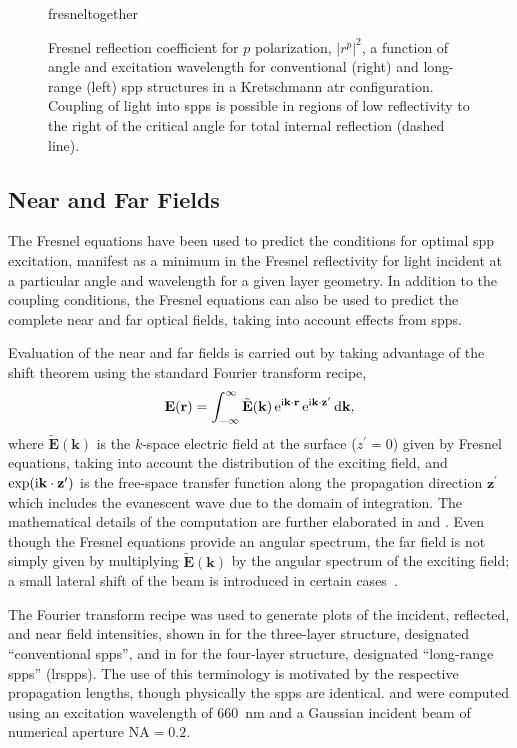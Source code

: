 \begin{figure}[ht]
	\centering
	{fresneltogether}
	\caption{Fresnel reflection coefficient for $p$ polarization, $|r^p|^2$, a
		function of angle and excitation wavelength for conventional (right) and
		long-range (left) \gls{spp} structures in a Kretschmann \gls{atr} configuration.
		Coupling of light into \glspl{spp} is possible in regions of low reflectivity to the right of the
		critical angle for total internal reflection (dashed line).}
	\label{fig:fresnelangle}
\end{figure}

\subsection{Near and Far Fields}\label{sec:fresnelnearfar}
The Fresnel equations have been used to predict the conditions for
optimal \gls{spp} excitation, manifest as a minimum in the Fresnel reflectivity
for light incident at a particular angle and wavelength for a given layer
geometry.  In addition to the coupling conditions, the Fresnel equations
can also be used to predict the complete near and far optical fields,
taking into account effects from \glspl{spp}.

Evaluation of the near and far fields is carried out by taking advantage of
the shift theorem using the standard Fourier transform recipe,
\begin{equation}
	\mathbf{E}(\mathbf{r}) = \int_{-\infty}^{\infty} \tilde{\mathbf{E}}(\mathbf{k})
	\,{\mathrm{e}}^{{\mathrm{i}} \mathbf{k} \cdot \mathbf{r}}
	\,{\mathrm{e}}^{{\mathrm{i}} \mathbf{k} \cdot \mathbf{z}^\prime} \,\mathrm{d} \mathbf{k},
\end{equation}
where $\tilde{\mathbf{E}}(\mathbf{k})$ is the $k$-space electric field at
the surface ($z^\prime=0$) given by Fresnel equations, taking into account
the distribution of the exciting field, and $\exp({\mathrm{i}} \mathbf{k} \cdot
	\mathbf{z}^\prime)$ is the free-space transfer function along the
propagation direction $\mathbf{z}^\prime$ which includes the evanescent
wave due to the domain of integration.  The mathematical details of the
computation are further elaborated in  and
.  Even though the Fresnel equations provide
an angular spectrum, the far field is not simply given by multiplying
$\tilde{\mathbf{E}}(\mathbf{k})$ by the angular spectrum of the exciting
field; a small lateral shift of the beam is introduced in certain
cases~\cite{chuang1986lateral}.

The Fourier transform recipe was used to generate plots of the incident,
reflected, and near field intensities, shown in
 for the three-layer structure, designated
``conventional \glspl{spp}'', and in  for the
four-layer structure, designated ``long-range \glspl{spp}'' (\glspl{lrspp}).  The use of
this terminology is motivated by the respective propagation lengths,
though physically the \glspl{spp} are identical.
 and 
were computed using an excitation wavelength of \SI{660}{\nano\meter}
and a Gaussian incident beam of numerical aperture $\mathrm{NA}=0.2$.

